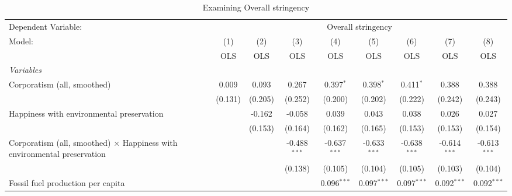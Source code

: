 
\begin{table}[htbp]
   \caption{Examining Overall stringency}
   \centering
   \begin{tabular}{lcccccccc}
      \toprule
      Dependent Variable: & \multicolumn{8}{c}{Overall stringency}\\
      Model:                                                                          & (1)     & (2)     & (3)            & (4)            & (5)            & (6)            & (7)            & (8)\\  
                                                                                      &  OLS    & OLS     & OLS            & OLS            & OLS            & OLS            & OLS            & OLS\\  
      \midrule
      \emph{Variables}\\
      Corporatism (all, smoothed)                                                     & 0.009   & 0.093   & 0.267          & 0.397$^{*}$    & 0.398$^{*}$    & 0.411$^{*}$    & 0.388          & 0.388\\   
                                                                                      & (0.131) & (0.205) & (0.252)        & (0.200)        & (0.202)        & (0.222)        & (0.242)        & (0.243)\\   
      Happiness with environmental preservation                                       &         & -0.162  & -0.058         & 0.039          & 0.043          & 0.038          & 0.026          & 0.027\\   
                                                                                      &         & (0.153) & (0.164)        & (0.162)        & (0.165)        & (0.153)        & (0.153)        & (0.154)\\   
      Corporatism (all, smoothed) $\times$ Happiness with environmental preservation  &         &         & -0.488$^{***}$ & -0.637$^{***}$ & -0.633$^{***}$ & -0.638$^{***}$ & -0.614$^{***}$ & -0.613$^{***}$\\   
                                                                                      &         &         & (0.138)        & (0.105)        & (0.104)        & (0.105)        & (0.103)        & (0.104)\\   
      Fossil fuel production per capita                                               &         &         &                & 0.096$^{***}$  & 0.097$^{***}$  & 0.097$^{***}$  & 0.092$^{***}$  & 0.092$^{***}$\\   

\end{tabular}
\end{table}
